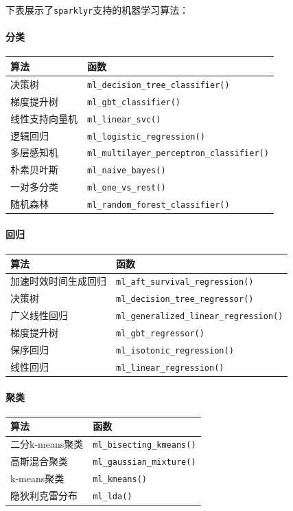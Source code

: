 \documentclass[
]{article}
\begin{document}
下表展示了\texttt{sparklyr}支持的机器学习算法：

\hypertarget{ux5206ux7c7b}{%
\paragraph{分类}\label{ux5206ux7c7b}}

\begin{longtable}[]{@{}ll@{}}
\toprule
算法 & 函数\tabularnewline
\midrule
\endhead
决策树 & \texttt{ml\_decision\_tree\_classifier()}\tabularnewline
梯度提升树 & \texttt{ml\_gbt\_classifier()}\tabularnewline
线性支持向量机 & \texttt{ml\_linear\_svc()}\tabularnewline
逻辑回归 & \texttt{ml\_logistic\_regression()}\tabularnewline
多层感知机 &
\texttt{ml\_multilayer\_perceptron\_classifier()}\tabularnewline
朴素贝叶斯 & \texttt{ml\_naive\_bayes()}\tabularnewline
一对多分类 & \texttt{ml\_one\_vs\_rest()}\tabularnewline
随机森林 & \texttt{ml\_random\_forest\_classifier()}\tabularnewline
\bottomrule
\end{longtable}

\hypertarget{ux56deux5f52}{%
\paragraph{回归}\label{ux56deux5f52}}

\begin{longtable}[]{@{}ll@{}}
\toprule
算法 & 函数\tabularnewline
\midrule
\endhead
加速时效时间生成回归 &
\texttt{ml\_aft\_survival\_regression()}\tabularnewline
决策树 & \texttt{ml\_decision\_tree\_regressor()}\tabularnewline
广义线性回归 &
\texttt{ml\_generalized\_linear\_regression()}\tabularnewline
梯度提升树 & \texttt{ml\_gbt\_regressor()}\tabularnewline
保序回归 & \texttt{ml\_isotonic\_regression()}\tabularnewline
线性回归 & \texttt{ml\_linear\_regression()}\tabularnewline
\bottomrule
\end{longtable}

\hypertarget{ux805aux7c7b}{%
\paragraph{聚类}\label{ux805aux7c7b}}

\begin{longtable}[]{@{}ll@{}}
\toprule
算法 & 函数\tabularnewline
\midrule
\endhead
二分k-means聚类 & \texttt{ml\_bisecting\_kmeans()}\tabularnewline
高斯混合聚类 & \texttt{ml\_gaussian\_mixture()}\tabularnewline
k-means聚类 & \texttt{ml\_kmeans()}\tabularnewline
隐狄利克雷分布 & \texttt{ml\_lda()}\tabularnewline
\bottomrule
\end{longtable}
\end{document}

